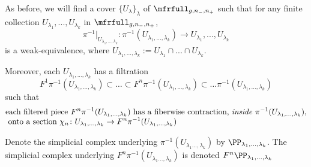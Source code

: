 \documentclass[a4paper,10pt]{amsart}
\begin{document}
As before, we will find a cover $\{U_{\lambda}\}_{\lambda}$ of $\mfrfull_{g,n_-,n_+}$ such that for any finite collection $U_{\lambda_1}, ..., U_{\lambda_k}$ in $\mfrfull_{g,n_-,n_+}$, 
\[\pi^{-1}|_{U_{\lambda_1,...,\lambda_k}} \colon \pi^{-1}(U_{\lambda_1,...,\lambda_k}) \to U_{\lambda_1}, ..., U_{\lambda_k}\]
is a weak-equivalence, where $U_{\lambda_1,...,\lambda_k}:= U_{\lambda_1} \cap ... \cap U_{\lambda_k}$.

Moreover, each $U_{\lambda_1,...,\lambda_k}$ has a filtration 
\[ F^1\pi^{-1}(U_{\lambda_1,...,\lambda_k}) \subset \hdots \subset F^n\pi^{-1}(U_{\lambda_1,...,\lambda_k}) \subset \hdots \pi^{-1}(U_{\lambda_1,...,\lambda_k})\]
such that 
\begin{equation}\label{filtrfulltcft}
	\begin{split}
		 &\mbox{each filtered piece } F^n\pi^{-1}(U_{\lambda_1,...,\lambda_k}) \mbox{ has a fiberwise contraction, \emph{inside} } \pi^{-1}(U_{\lambda_1,...,\lambda_k}),\\[-4pt]
		 & \mbox{ onto a section } \chi_n \colon U_{\lambda_1,...,\lambda_k} \to F^n\pi^{-1}(U_{\lambda_1,...,\lambda_k})
	\end{split}
\end{equation}

\begin{notation}
Denote the simplicial complex underlying $\pi^{-1}(U_{\lambda_1 ...,\lambda_k})$ by $\PP_{\lambda_1,...,\lambda_k}$. The simplicial complex underlying $F^n\pi^{-1}(U_{\lambda_1 ...,\lambda_k})$ is denoted $F^n\PP_{\lambda_1,...,\lambda_k}$
\end{notation}
\end{document}
